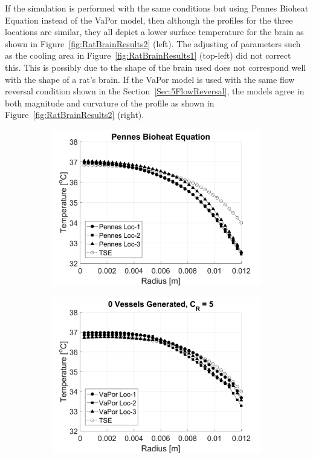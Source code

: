 \documentclass[11pt,english,a4paper,twoside,openright]{report}
\begin{document}
{{{{{{{If the simulation is performed with the same conditions but using Pennes Bioheat Equation instead of the VaPor model, then although the profiles for the three locations are similar, they all depict a lower surface temperature for the brain as shown in Figure~\ref{fig:RatBrainResults2} (left). The adjusting of parameters such as the cooling area in Figure~\ref{fig:RatBrainResults1} (top-left) did not correct this. This is possibly due to the shape of the brain used does not correspond well with the shape of a rat's brain. If the VaPor model is used with the same flow reversal condition shown in the Section~\ref{Sec:5FlowReversal}, the models agree in both magnitude and curvature of the profile as shown in Figure~\ref{fig:RatBrainResults2} (right).

\begin{figure}[h]
	\centering
	\begin{subfigure}[b]{0.49\textwidth}
		\includegraphics[width=\textwidth]{Chapter5/Chapter5_RatBrain_Pennes}
	\end{subfigure}
	\begin{subfigure}[b]{0.49\textwidth}
		\includegraphics[width=\textwidth]{Chapter5/Chapter5_RatBrainCounterCurrent}

\end{subfigure}
\end{figure}}}}}}}}
\end{document}
